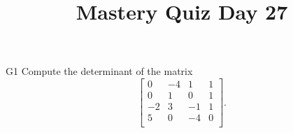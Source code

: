 \documentclass{sbgLAquiz}
\title{Mastery Quiz Day 27 }
\begin{document}
\begin{problem}{G1}
Compute the determinant of the matrix
\[
  \begin{bmatrix}
    0 & -4 & 1 & 1 \\
    0 & 1 & 0 & 1 \\
    -2 & 3 & -1 & 1 \\
    5 & 0 & -4 & 0 \\
  \end{bmatrix}
.\]
\end{problem}
\end{document}
